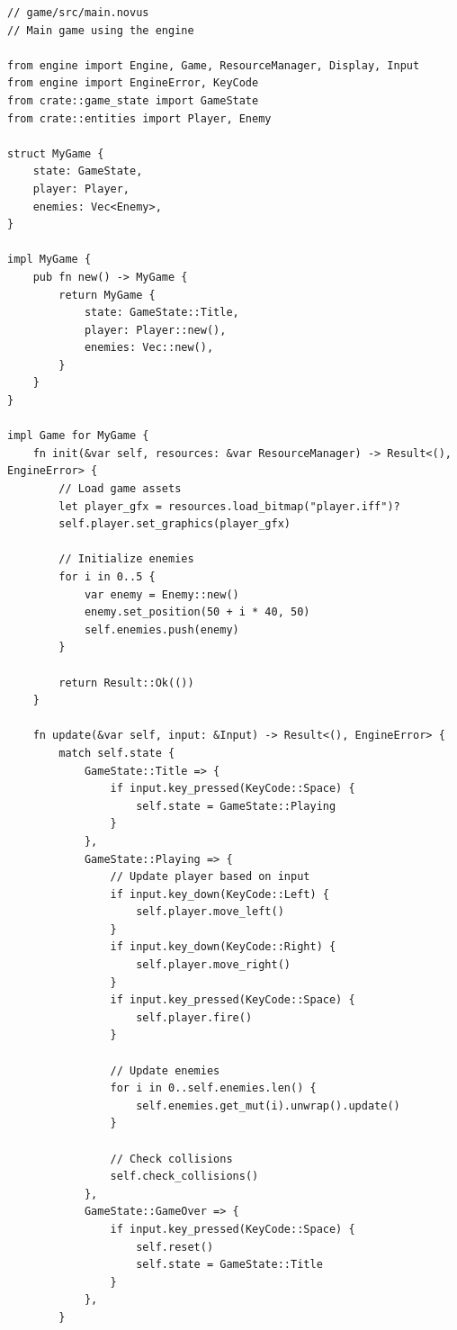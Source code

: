 \begin{lstlisting}
// game/src/main.novus
// Main game using the engine

from engine import Engine, Game, ResourceManager, Display, Input
from engine import EngineError, KeyCode
from crate::game_state import GameState
from crate::entities import Player, Enemy

struct MyGame {
    state: GameState,
    player: Player,
    enemies: Vec<Enemy>,
}

impl MyGame {
    pub fn new() -> MyGame {
        return MyGame {
            state: GameState::Title,
            player: Player::new(),
            enemies: Vec::new(),
        }
    }
}

impl Game for MyGame {
    fn init(&var self, resources: &var ResourceManager) -> Result<(), EngineError> {
        // Load game assets
        let player_gfx = resources.load_bitmap("player.iff")?
        self.player.set_graphics(player_gfx)

        // Initialize enemies
        for i in 0..5 {
            var enemy = Enemy::new()
            enemy.set_position(50 + i * 40, 50)
            self.enemies.push(enemy)
        }

        return Result::Ok(())
    }

    fn update(&var self, input: &Input) -> Result<(), EngineError> {
        match self.state {
            GameState::Title => {
                if input.key_pressed(KeyCode::Space) {
                    self.state = GameState::Playing
                }
            },
            GameState::Playing => {
                // Update player based on input
                if input.key_down(KeyCode::Left) {
                    self.player.move_left()
                }
                if input.key_down(KeyCode::Right) {
                    self.player.move_right()
                }
                if input.key_pressed(KeyCode::Space) {
                    self.player.fire()
                }

                // Update enemies
                for i in 0..self.enemies.len() {
                    self.enemies.get_mut(i).unwrap().update()
                }

                // Check collisions
                self.check_collisions()
            },
            GameState::GameOver => {
                if input.key_pressed(KeyCode::Space) {
                    self.reset()
                    self.state = GameState::Title
                }
            },
        }


\end{lstlisting}
